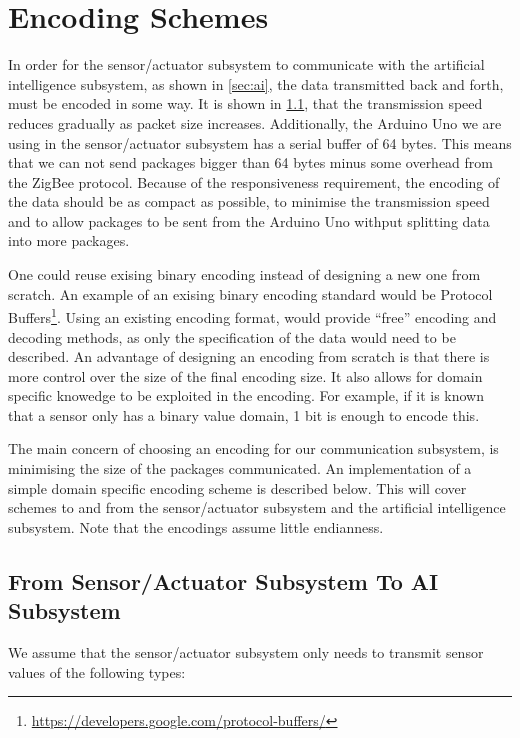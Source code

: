 \section{Encoding Schemes}

In order for the sensor/actuator subsystem to communicate with the artificial intelligence subsystem, as shown in \cref{sec:ai}, the data transmitted back and forth, must be encoded in some way. It is shown in \cref{}, that the transmission speed reduces gradually as packet size increases. Additionally, the Arduino Uno we are using in the sensor/actuator subsystem has a serial buffer of 64 bytes. This means that we can not send packages bigger than 64 bytes minus some overhead from the ZigBee protocol. Because of the responsiveness requirement, the encoding of the data should be as compact as possible, to minimise the transmission speed and to allow packages to be sent from the Arduino Uno withput splitting data into more packages.

One could reuse exising binary encoding instead of designing a new one from scratch. An example of an exising binary encoding standard would be Protocol Buffers\footnote{\url{https://developers.google.com/protocol-buffers/}}. Using an existing encoding format, would provide \enquote{free} encoding and decoding methods, as only the specification of the data would need to be described. An advantage of designing an encoding from scratch is that there is more control over the size of the final encoding size. It also allows for domain specific knowedge to be exploited in the encoding. For example, if it is known that a sensor only has a binary value domain, 1 bit is enough to encode this.

The main concern of choosing an encoding for our communication subsystem, is minimising the size of the packages communicated. An implementation of a simple domain specific encoding scheme is described below. This will cover schemes to and from the sensor/actuator subsystem and the artificial intelligence subsystem. Note that the encodings assume little endianness.

\subsection{From Sensor/Actuator Subsystem To AI Subsystem}
We assume that the sensor/actuator subsystem only needs to transmit sensor values of the following types:

